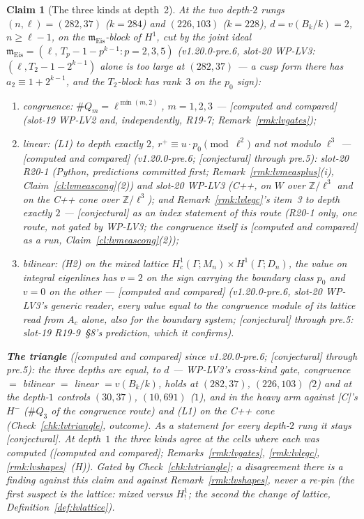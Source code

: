 \documentclass[11pt]{article}
\newtheorem{claim}[theorem]{Claim}
\theoremstyle{remark}
\newcommand{\Z}{\mathbb{Z}}
\newcommand{\Ga}{\Gamma}
\newcommand{\m}{\mathfrak{m}}
\newcommand{\Mn}{M_n}
\newcommand{\Dn}{D_n}
\newcommand{\CONJ}{\textsf{[conjectural]}}
\newcommand{\CMPD}{\textsf{[computed and compared]}}   %
\begin{document}
\begin{claim}[The three kinds at depth~2]\label{cl:lvtriangle}
At the two depth-$2$ rungs $(n,\ell)=(282,37)$ ($k=284$) and $(226,103)$ ($k=228$), $d=v(B_k/k)=2$, $n\ge\ell-1$, on the $\m_{\mathrm{Eis}}$-block of $H^{1}$, cut by the \emph{joint} ideal
$\m_{\mathrm{Eis}}=(\ell,\,T_p-1-p^{k-1}:p=2,3,5)$ (v1.20.0-pre.6, slot-20 WP-LV3: $(\ell,T_2-1-2^{k-1})$ alone is too large at $(282,37)$ --- a cusp form there has $a_2\equiv1+2^{k-1}$, and the
$T_2$-block has rank~$3$ on the $p_0$ sign):
\begin{enumerate}
\item[(C)] \textsf{congruence}: $\#Q_m=\ell^{\min(m,2)}$, $m=1,2,3$ --- \CMPD{} (slot-19 WP-LV2 and, independently, R19-7; Remark~\ref{rmk:lvgates});
\item[(L)] \textsf{linear}: (L1) to depth exactly $2$, $r^{+}\equiv u\cdot p_0\pmod{\ell^{2}}$ and not modulo $\ell^{3}$ --- \CMPD{} (v1.20.0-pre.6; \CONJ{} through pre.5): slot-20 R20-1 (Python,
  predictions committed first; Remark~\ref{rmk:lvmeasplus}(i), Claim~\ref{cl:lvmeascong}(2)) and slot-20 WP-LV3 (C++, on $W$ over $\Z/\ell^{3}$ and on the C++ cone over $\Z/\ell^{3}$); and
  Remark~\ref{rmk:lvlegc}'s item~3 to depth exactly $2$ --- \CONJ{} as an index statement of this route (R20-1
  only, one route, not gated by WP-LV3; the congruence itself is \CMPD{} as a run, Claim~\ref{cl:lvmeascong}(2));
\item[(H)] \textsf{bilinear}: (H2) on the mixed lattice $H^{1}_c(\Ga;\Mn)\times H^{1}(\Ga;\Dn)$, the value on integral eigenlines has $v=2$ on the sign carrying the boundary class
  $p_0$ and $v=0$ on the other --- \CMPD{} (v1.20.0-pre.6, slot-20 WP-LV3's generic reader, every value equal to the congruence module of its lattice read from $A_c$ alone, also for the boundary
  system; \CONJ{} through pre.5: slot-19 R19-9~\S8's prediction, which it confirms).
\end{enumerate}
\textbf{The triangle} (\CMPD{} since v1.20.0-pre.6; \CONJ{} through pre.5): the three depths are equal, to $d$ --- WP-LV3's cross-kind gate, congruence $=$ bilinear $=$ linear $=v(B_k/k)$,
holds at $(282,37)$, $(226,103)$ ($2$) and at the depth-$1$ controls $(30,37)$, $(10,691)$ ($1$), and in the heavy arm against [C]'s $H^{-}$ ($\#Q_3$ of the \textsf{congruence} route) and (L1) on the C++
cone (Check~\ref{chk:lvtriangle}, outcome). As a statement for every depth-$2$ rung it stays \CONJ. At depth~$1$ the three kinds agree at the cells where each was computed (\CMPD; Remarks~\ref{rmk:lvgates},
\ref{rmk:lvlegc}, \ref{rmk:lvshapes}~(H)). Gated by Check~\ref{chk:lvtriangle}; a disagreement there is a finding against this claim and against Remark~\ref{rmk:lvshapes}, never a
re-pin (the first suspect is the lattice: mixed versus $H^{1}_{!}$; the second the change of lattice, Definition~\ref{def:lvlattice}).
\end{claim}
\end{document}
